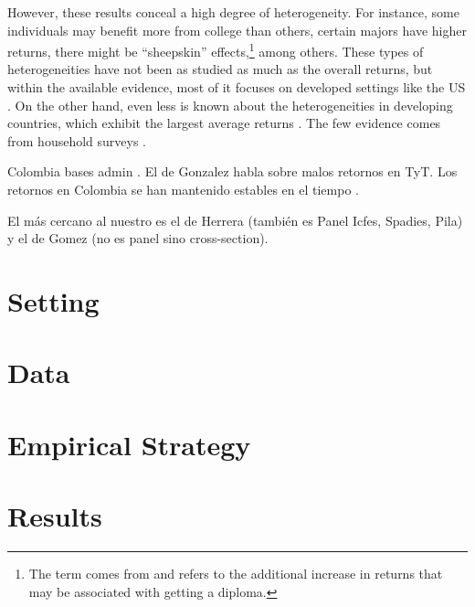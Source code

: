 \documentclass[12pt, a4paper]{article}
\begin{document}
However, these results conceal a high degree of heterogeneity. For instance, some individuals may benefit more from college than others, certain majors have higher returns, there might be ``sheepskin'' effects,\footnote{The term comes from \citet{layard1974screening} and refers to the additional increase in returns that may be associated with getting a diploma.} among others. These types of heterogeneities have not been as studied as much as the overall returns, but within the available evidence, most of it focuses on developed settings like the US \citep{altonji2018costs,altonji2021labor,andrews2022returns,zimmerman2014returns}. On the other hand, even less is known about the heterogeneities in developing countries, which exhibit the largest average returns \citep{peet2015returns}. The few evidence comes from household surveys \citep{belskaya2020heterogeneity,levy2016labor}.

Colombia bases admin \citep{gonzalez2015returns,herrera2020economic,gomez2022returns}. El de Gonzalez habla sobre malos retornos en TyT.
Los retornos en Colombia se han mantenido estables en el tiempo \citep{tenjo2017evolution}.

El más cercano al nuestro es el de Herrera (también es Panel Icfes, Spadies, Pila) y el de Gomez (no es panel sino cross-section).


\section{Setting} \label{sec:context}



\section{Data} \label{sec:data}




\section{Empirical Strategy} \label{sec:empirical}





\section{Results} \label{sec:results}
\end{document}
